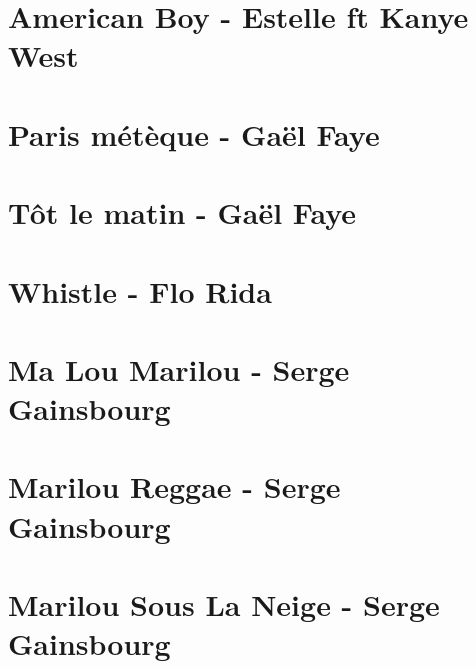 \documentclass{guitartabs}
\begin{document}
\section{American Boy - Estelle ft Kanye West}
\begin{guitar}

\end{guitar}



\section{Paris métèque - Gaël Faye}
\begin{guitar}

\end{guitar}


\section{Tôt le matin - Gaël Faye}
\begin{guitar}

\end{guitar}

\section{Whistle - Flo Rida}
\begin{guitar}

\end{guitar}


\section{Ma Lou Marilou - Serge Gainsbourg}
\begin{guitar}

\end{guitar}

\section{Marilou Reggae - Serge Gainsbourg}
\begin{guitar}

\end{guitar}

\section{Marilou Sous La Neige - Serge Gainsbourg}
\begin{guitar}

\end{guitar}
\end{document}
